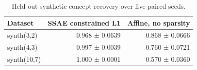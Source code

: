 \begin{table}[t]
\centering
\caption{Held-out synthetic concept recovery over five paired seeds.}
\label{tab:synthetic-identification-reproduced}
\begin{tabular}{lrr}
\toprule
Dataset & SSAE constrained L1 & Affine, no sparsity \\
\midrule
synth(3,2) & 0.968 ± 0.0639 & 0.868 ± 0.0666 \\
synth(4,3) & 0.997 ± 0.0039 & 0.760 ± 0.0721 \\
synth(10,7) & 1.000 ± 0.0001 & 0.570 ± 0.0360 \\
\bottomrule
\end{tabular}
\end{table}
